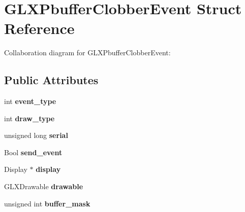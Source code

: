 \hypertarget{struct_g_l_x_pbuffer_clobber_event}{\section{G\+L\+X\+Pbuffer\+Clobber\+Event Struct Reference}
\label{struct_g_l_x_pbuffer_clobber_event}
}


Collaboration diagram for G\+L\+X\+Pbuffer\+Clobber\+Event\+:
\subsection*{Public Attributes}
\begin{DoxyCompactItemize}
\item 
\hypertarget{struct_g_l_x_pbuffer_clobber_event_a30d7162d8d77246b01f5e610cda4da68}{int {\bfseries event\+\_\+type}}\label{struct_g_l_x_pbuffer_clobber_event_a30d7162d8d77246b01f5e610cda4da68}

\item 
\hypertarget{struct_g_l_x_pbuffer_clobber_event_a243f92b79d3cfbde73eab02815be2320}{int {\bfseries draw\+\_\+type}}\label{struct_g_l_x_pbuffer_clobber_event_a243f92b79d3cfbde73eab02815be2320}

\item 
\hypertarget{struct_g_l_x_pbuffer_clobber_event_a6390b2875ae06a4cb827d2b4c321eda3}{unsigned long {\bfseries serial}}\label{struct_g_l_x_pbuffer_clobber_event_a6390b2875ae06a4cb827d2b4c321eda3}

\item 
\hypertarget{struct_g_l_x_pbuffer_clobber_event_aa51969e67e4ad6095bda26ca64fe8ba6}{Bool {\bfseries send\+\_\+event}}\label{struct_g_l_x_pbuffer_clobber_event_aa51969e67e4ad6095bda26ca64fe8ba6}

\item 
\hypertarget{struct_g_l_x_pbuffer_clobber_event_aeb49bb93cc59448e75d66170a39596d1}{Display $\ast$ {\bfseries display}}\label{struct_g_l_x_pbuffer_clobber_event_aeb49bb93cc59448e75d66170a39596d1}

\item 
\hypertarget{struct_g_l_x_pbuffer_clobber_event_a388908b766e35205c1a461ea8b60439f}{G\+L\+X\+Drawable {\bfseries drawable}}\label{struct_g_l_x_pbuffer_clobber_event_a388908b766e35205c1a461ea8b60439f}

\item 
\hypertarget{struct_g_l_x_pbuffer_clobber_event_aff4c23d00f6dad98427f8d32a5f10580}{unsigned int {\bfseries buffer\+\_\+mask}}\label{struct_g_l_x_pbuffer_clobber_event_aff4c23d00f6dad98427f8d32a5f10580}


\end{DoxyCompactItemize}
